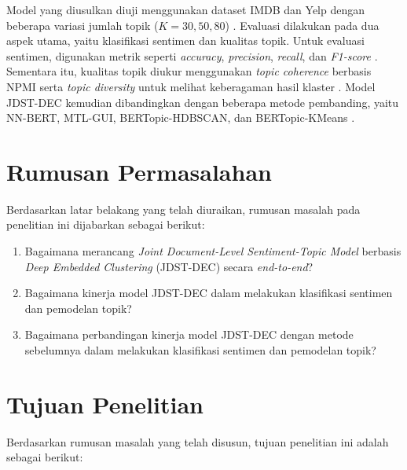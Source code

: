 \bigskip

Model yang diusulkan diuji menggunakan dataset IMDB dan Yelp dengan beberapa
variasi jumlah topik ($K = 30, 50, 80$) \parencite{maas2011learning,
zhang2015character}. Evaluasi dilakukan pada dua aspek utama, yaitu klasifikasi
sentimen dan kualitas topik. Untuk evaluasi sentimen, digunakan metrik seperti
\textit{accuracy}, \textit{precision}, \textit{recall}, dan \textit{F1-score}
\parencite{sokolova2009}. Sementara itu, kualitas topik diukur menggunakan
\textit{topic coherence} berbasis NPMI serta \textit{topic diversity} untuk
melihat keberagaman hasil klaster \parencite{ocallaghan2015, dieng2020topic}.
Model JDST-DEC kemudian dibandingkan dengan beberapa metode pembanding, yaitu
NN-BERT, MTL-GUI, BERTopic-HDBSCAN, dan BERTopic-KMeans
\parencite{gui2022mtml, grootendorst2022bertopic}.


\section{Rumusan Permasalahan}

Berdasarkan latar belakang yang telah diuraikan, rumusan masalah pada penelitian ini dijabarkan sebagai berikut:

\begin{enumerate}
    \item Bagaimana merancang \textit{Joint Document-Level Sentiment-Topic Model} berbasis \textit{Deep Embedded Clustering} (JDST-DEC) secara \textit{end-to-end}?

    \item Bagaimana kinerja model JDST-DEC dalam melakukan klasifikasi sentimen dan pemodelan topik?

    \item Bagaimana perbandingan kinerja model JDST-DEC dengan metode sebelumnya dalam melakukan klasifikasi sentimen dan pemodelan topik?
\end{enumerate}


\section{Tujuan Penelitian}

Berdasarkan rumusan masalah yang telah disusun, tujuan penelitian ini adalah sebagai berikut:

